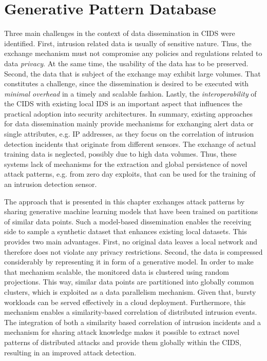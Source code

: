 \documentclass[../../main.tex]{subfiles}
\begin{document}
\chapter{Generative Pattern Database}
Three main challenges in the context of data dissemination in CIDS were identified. First, intrusion related data is usually of sensitive nature. Thus, the exchange mechanism must not compromise any policies and regulations related to data \textit{privacy}. At the same time, the usability of the data has to be preserved. Second, the data that is subject of the exchange may exhibit large volumes. That constitutes a challenge, since the dissemination is desired to be executed with \textit{minimal overhead} in a timely and scalable fashion. Lastly, the \textit{interoperability} of the CIDS with existing local IDS is an important aspect that influences the practical adoption into security architectures. In summary, existing approaches for data dissemination mainly provide mechanisms for exchanging alert data or single attributes, e.g. IP addresses, as they focus on the correlation of intrusion detection incidents that originate from different sensors. The exchange of actual training data is neglected, possibly due to high data volumes. Thus, these systems lack of mechanisms for the extraction and global persistence of novel attack patterns, e.g. from zero day exploits, that can be used for the training of an intrusion detection sensor.

The approach that is presented in this chapter exchanges attack patterns by sharing generative machine learning models that have been trained on partitions of similar data points. Such a model-based dissemination enables the receiving side to sample a synthetic dataset that enhances existing local datasets. This provides two main advantages. First, no original data leaves a local network and therefore does not violate any privacy restrictions. Second, the data is compressed considerably by representing it in form of a generative model. In order to make that mechanism scalable, the monitored data is clustered using random projections. This way, similar data points are partitioned into globally common clusters, which is exploited as a data parallelism mechanism. Given that, bursty workloads can be served effectively in a cloud deployment. Furthermore, this mechanism enables a similarity-based correlation of distributed intrusion events. The integration of both a similarity based correlation of intrusion incidents and a mechanism for sharing attack knowledge makes it possible to extract novel patterns of distributed attacks and provide them globally within the CIDS, resulting in an improved attack detection.
\end{document}
